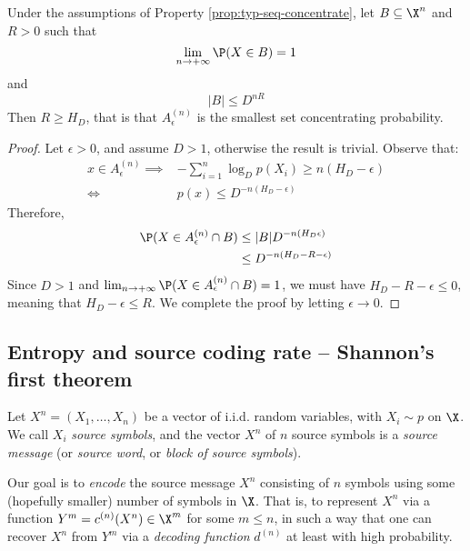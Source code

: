 \documentclass[toc]{../cs-classes/cs-classes}
\begin{document}
\begin{property}
    \label{prop:a-eps-smallest}
    Under the assumptions of Property \ref{prop:typ-seq-concentrate}, let $B\subseteq \X^n$ and $R>0$ such that
    \begin{equation*}
        \lim_{n\to+\infty}\P(X\in B)=1
    \end{equation*}
    and
    \begin{equation*}
        |B|\leq D^{nR}
    \end{equation*}
    Then $R\geq H_D$, that is that $A_\epsilon^{(n)}$ is the smallest set concentrating probability.
\end{property}

\begin{proof}
    Let $\epsilon>0$, and assume $D>1$, otherwise the result is trivial. Observe that:
    \begin{equation*}
        \begin{aligned}
            x\in A_\epsilon^{(n)}\implies&-\sum_{i=1}^n \log_D p(X_i)\geq n(H_D-\epsilon)\\
            \iff& p(x)\leq D^{-n(H_D-\epsilon)}
        \end{aligned}
    \end{equation*}
    Therefore,
    \begin{equation*}
        \begin{aligned}
            \P(X\in A_\epsilon^{(n)}\cap B)&\leq |B|D^{-n(H_D\epsilon)}\\
            &\leq D^{-n(H_D-R-\epsilon)}
        \end{aligned}
    \end{equation*}
    Since $D>1$ and $\lim_{n\to+\infty}\P(X\in A_\epsilon^{(n)}\cap B)=1$, we must have $H_D-R-\epsilon\leq 0$, meaning that $H_D-\epsilon\leq R$. We complete the proof by letting $\epsilon\to 0$. 
\end{proof}

\subsection{Entropy and source coding rate -- Shannon's first theorem}
\begin{definition}
    Let $X^n=(X_1, \dots, X_n)$ be a vector of i.i.d. random variables, with $X_i\sim p$ on $\X$. We call $X_i$ \emph{source symbols}, and the vector $X^n$ of $n$ source symbols is a \emph{source message} (or \emph{source word}, or \emph{block of source symbols}). 

    Our goal is to \emph{encode} the source message $X^n$ consisting of $n$ symbols using some (hopefully smaller) number of symbols in $\X$. That is, to represent $X^n$ via a function $Y^m=c^{(n)}(X^n)\in \X^m$ for some $m\leq n$, in such a way that one can recover $X^n$ from $Y^m$ via a \emph{decoding function} $d^{(n)}$ at least with high probability.
\end{definition}
\end{document}
